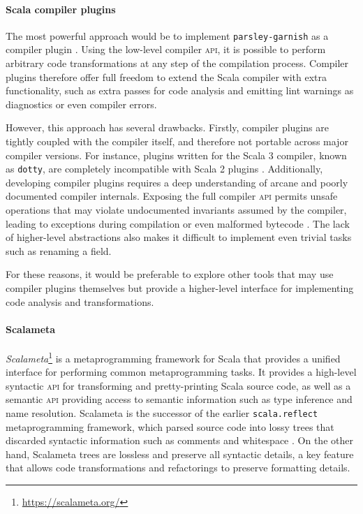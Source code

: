 \paragraph{Scala compiler plugins}
The most powerful approach would be to implement \texttt{parsley-garnish} as a compiler plugin \cite{pickering_plugins_2019}.
Using the low-level compiler \textsc{api}, it is possible to perform arbitrary code transformations at any step of the compilation process.
Compiler plugins therefore offer full freedom to extend the Scala compiler with extra functionality, such as extra passes for code analysis and emitting lint warnings as diagnostics or even compiler errors.

However, this approach has several drawbacks.
Firstly, compiler plugins are tightly coupled with the compiler itself, and therefore not portable across major compiler versions.
For instance, plugins written for the Scala 3 compiler, known as \texttt{dotty}, are completely incompatible with Scala 2 plugins \cite{lampepfl_changes_2022}.
Additionally, developing compiler plugins requires a deep understanding of arcane and poorly documented compiler internals.
Exposing the full compiler \textsc{api} permits unsafe operations that may violate undocumented invariants assumed by the compiler, leading to exceptions during compilation or even malformed bytecode \cite{sherwany_refactoring_2015}.
The lack of higher-level abstractions also makes it difficult to implement even trivial tasks such as renaming a field.

For these reasons, it would be preferable to explore other tools that may use compiler plugins themselves but provide a higher-level interface for implementing code analysis and transformations.

\paragraph{Scalameta}
\textit{Scalameta}\footnote{\url{https://scalameta.org/}} is a metaprogramming framework for Scala that provides a unified interface for performing common metaprogramming tasks.
It provides a high-level syntactic \textsc{api} for transforming and pretty-printing Scala source code, as well as a semantic \textsc{api} providing access to semantic information such as type inference and name resolution.
Scalameta is the successor of the earlier \texttt{scala.reflect} metaprogramming framework, which parsed source code into lossy trees that discarded syntactic information such as comments and whitespace \cite{burmako_scalameta_2017}.
On the other hand, Scalameta trees are lossless and preserve all syntactic details, a key feature that allows code transformations and refactorings to preserve formatting details.

